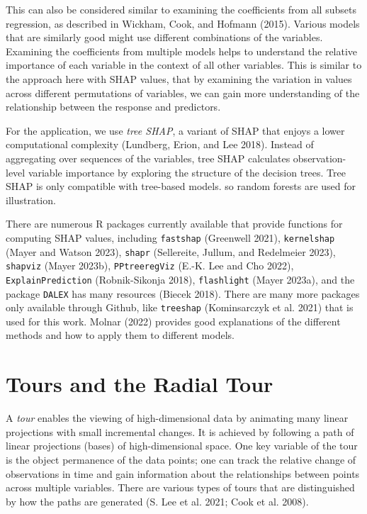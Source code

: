 \documentclass[
]{article}
\begin{document}
This can also be considered similar to examining the coefficients from all subsets regression, as described in Wickham, Cook, and Hofmann (2015). Various models that are similarly good might use different combinations of the variables. Examining the coefficients from multiple models helps to understand the relative importance of each variable in the context of all other variables. This is similar to the approach here with SHAP values, that by examining the variation in values across different permutations of variables, we can gain more understanding of the relationship between the response and predictors.

For the application, we use \emph{tree SHAP}, a variant of SHAP that enjoys a lower computational complexity (Lundberg, Erion, and Lee 2018). Instead of aggregating over sequences of the variables, tree SHAP calculates observation-level variable importance by exploring the structure of the decision trees. Tree SHAP is only compatible with tree-based models. so random forests are used for illustration.

There are numerous R packages currently available that provide functions for computing SHAP values, including \texttt{fastshap} (Greenwell 2021), \texttt{kernelshap} (Mayer and Watson 2023), \texttt{shapr} (Sellereite, Jullum, and Redelmeier 2023), \texttt{shapviz} (Mayer 2023b), \texttt{PPtreeregViz} (E.-K. Lee and Cho 2022), \texttt{ExplainPrediction} (Robnik-Sikonja 2018), \texttt{flashlight} (Mayer 2023a), and the package \texttt{DALEX} has many resources (Biecek 2018). There are many more packages only available through Github, like \texttt{treeshap} (Kominsarczyk et al. 2021) that is used for this work. Molnar (2022) provides good explanations of the different methods and how to apply them to different models.

\hypertarget{sec:tour}{%
\section{Tours and the Radial Tour}\label{sec:tour}}

A \emph{tour} enables the viewing of high-dimensional data by animating many linear projections with small incremental changes. It is achieved by following a path of linear projections (bases) of high-dimensional space. One key variable of the tour is the object permanence of the data points; one can track the relative change of observations in time and gain information about the relationships between points across multiple variables. There are various types of tours that are distinguished by how the paths are generated (S. Lee et al. 2021; Cook et al. 2008).
\end{document}

